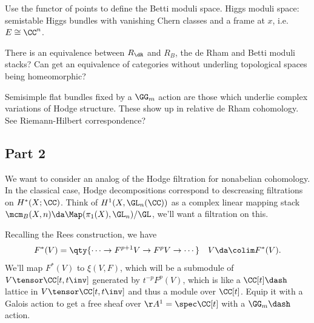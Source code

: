 \begin{remark}

Use the functor of points to define the Betti moduli space. Higgs moduli
space: semistable Higgs bundles with vanishing Chern classes and a frame
at \(x\), i.e.~\(E \cong \CC^n\).

\end{remark}

\begin{remark}

There is an equivalence between \(R_\dR\) and \(R_B\), the de Rham and
Betti moduli stacks? Can get an equivalence of categories without
underling topological spaces being homeomorphic?

\end{remark}

\begin{remark}

Semisimple flat bundles fixed by a \(\GG_m\) action are those which
underlie complex variations of Hodge structure. These show up in
relative de Rham cohomology. See Riemann-Hilbert correspondence?

\end{remark}

\hypertarget{part-2}{%
\subsection{Part 2}\label{part-2}}

\begin{remark}

We want to consider an analog of the Hodge filtration for nonabelian
cohomology. In the classical case, Hodge decompositions correspond to
descreasing filtrations on \(H^*(X; \CC)\). Think of
\(H^1(X, \GL_n(\CC))\) as a complex linear mapping stack
\(\mcm_B(X, n) \da \Map(\pi_1(X), \GL_n) / \GL\), we'll want a
filtration on this.

\end{remark}

\begin{remark}

Recalling the Rees construction, we have
\begin{align*}
F^*(V) = \qty{\cdots \to F^{p+1} V \to F^p V \to \cdots } && V\da \colim F^*(V) 
.\end{align*}
We'll map \(F^*(V)\) to \(\xi(V, F)\), which will be a submodule of
\(V \tensor \CC[t, t\inv]\) generated by \(t^{-p} F^p(V)\), which is
like a \(\CC[t]\dash\)lattice in \(V\tensor \CC[t, t\inv]\) and thus a
module over \(\CC[t]\). Equip it with a Galois action to get a free
sheaf over \(\AA^1 = \spec \CC[t]\) with a \(\GG_m\dash\)action.

\end{remark}

